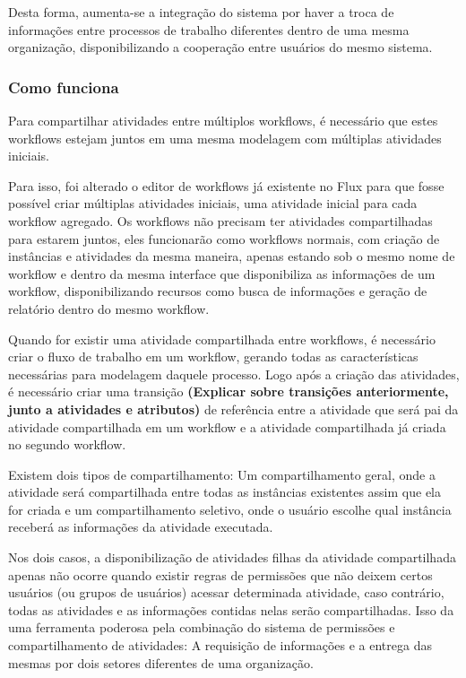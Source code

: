 Desta forma, aumenta-se a integração do sistema por haver a troca de informações entre processos de trabalho diferentes dentro de uma mesma organização, disponibilizando a cooperação entre usuários do mesmo sistema.

\subsubsection{Como funciona}

Para compartilhar atividades entre múltiplos workflows, é necessário que estes workflows estejam juntos em uma mesma modelagem com múltiplas atividades iniciais.

Para isso, foi alterado o editor de workflows já existente no Flux para que fosse possível criar múltiplas atividades iniciais, uma atividade inicial para cada workflow agregado.
Os workflows não precisam ter atividades compartilhadas para estarem juntos, eles funcionarão como workflows normais, com criação de instâncias e atividades da mesma maneira, apenas estando sob o mesmo nome de workflow e dentro da mesma interface que disponibiliza as informações de um workflow, disponibilizando recursos como busca de informações e geração de relatório dentro do mesmo workflow.

Quando for existir uma atividade compartilhada entre workflows, é necessário criar o fluxo de trabalho em um workflow, gerando todas as características necessárias para modelagem daquele processo. Logo após a criação das atividades, é necessário criar uma transição \textbf{(Explicar sobre transições anteriormente, junto a atividades e atributos)} de referência entre a atividade que será pai da atividade compartilhada em um workflow e a atividade compartilhada já criada no segundo workflow.

Existem dois tipos de compartilhamento: Um compartilhamento geral, onde a atividade será compartilhada entre todas as instâncias existentes assim que ela for criada e um compartilhamento seletivo, onde o usuário escolhe qual instância receberá as informações da atividade executada.

Nos dois casos, a disponibilização de atividades filhas da atividade compartilhada apenas não ocorre quando existir regras de permissões que não deixem certos usuários (ou grupos de usuários) acessar determinada atividade, caso contrário, todas as atividades e as informações contidas nelas serão compartilhadas.
Isso da uma ferramenta poderosa pela combinação do sistema de permissões e compartilhamento de atividades: A requisição de informações e a entrega das mesmas por dois setores diferentes de uma organização.

